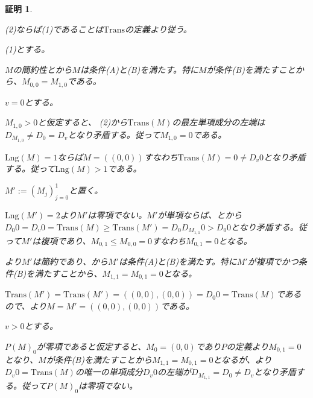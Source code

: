 \documentclass[dvipdfmx,uplatex]{jsarticle}
\theoremstyle{customnonumberbreakfortheorem}
\theoremstyle{customnonumberbreakforproof}
\newtheorem{hideableproof}{証明}
\begin{document}
\begin{hideableproof}
	\begin{indented}
		\item (2)ならば(1)であることは\(\textrm{Trans}\)の定義より従う。
		\item (1)とする。
		\begin{indented}
			\item \(M\)の簡約性とから\(M\)は条件(A)と(B)を満たす。特に\(M\)が条件(B)を満たすことから、\(M_{0,0} = M_{1,0}\)である。
			\item \(v = 0\)とする。
			\begin{indented}
				\item \(M_{1,0} > 0\)と仮定すると、 (2)から\(\textrm{Trans}(M)\)の最左単項成分の左端は\(D_{M_{1,0}} \neq D_0 = D_v\)となり矛盾する。従って\(M_{1,0} = 0\)である。
				\item \(\textrm{Lng}(M) = 1\)ならば\(M= ((0,0))\)すなわち\(\textrm{Trans}(M) = 0 \neq D_v 0\)となり矛盾する。従って\(\textrm{Lng}(M) > 1\)である。
				\item \(M' := (M_j)_{j=0}^{1}\)と置く。
				\item \(\textrm{Lng}(M') = 2\)より\(M'\)は零項でない。\(M'\)が単項ならば、とから\(D_0 0 = D_v 0 = \textrm{Trans}(M) \geq \textrm{Trans}(M') = D_0 D_{M_{1,1}} 0 > D_0 0\)となり矛盾する。従って\(M'\)は複項であり、\(M_{0,1} \leq M_{0,0} = 0\)すなわち\(M_{0,1} = 0\)となる。
				\item {}より\(M'\)は簡約であり、から\(M'\)は条件(A)と(B)を満たす。特に\(M'\)が複項でかつ条件(B)を満たすことから、\(M_{1,1} = M_{0,1} = 0\)となる。
				\item \(\textrm{Trans}(M') = \textrm{Trans}(M') = ((0,0),(0,0)) = D_0 0 = \textrm{Trans}(M)\)であるので、より\(M = M' = ((0,0),(0,0))\)である。
			\end{indented}
			\item \(v > 0\)とする。
			\begin{indented}
				\item \(P(M)_0\)が零項であると仮定すると、\(M_0 = (0,0)\)であり\(P\)の定義より\(M_{0,1} = 0\)となり、\(M\)が条件(B)を満たすことから\(M_{1,1} = M_{0,1} = 0\)となるが、より\(D_v 0 = \textrm{Trans}(M)\)の唯一の単項成分\(D_v 0\)の左端が\(D_{M_{1,1}} = D_0 \neq D_v\)となり矛盾する。従って\(P(M)_0\)は零項でない。

\end{indented}
\end{indented}
\end{indented}
\end{hideableproof}
\end{document}
